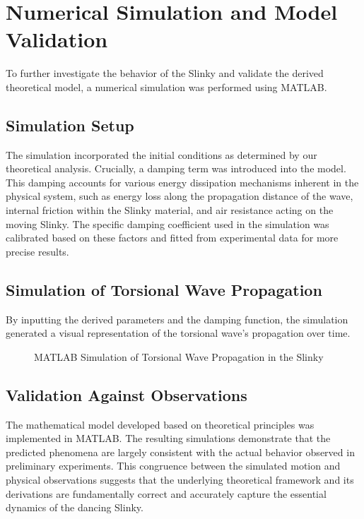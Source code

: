 \documentclass{mcmthesis}  %
\begin{document}
\section{Numerical Simulation and Model Validation}
To further investigate the behavior of the Slinky and validate the derived theoretical model, a numerical simulation was performed using MATLAB.

\subsection{Simulation Setup}
The simulation incorporated the initial conditions as determined by our theoretical analysis. Crucially, a damping term was introduced into the model. This damping accounts for various energy dissipation mechanisms inherent in the physical system, such as energy loss along the propagation distance of the wave, internal friction within the Slinky material, and air resistance acting on the moving Slinky. The specific damping coefficient used in the simulation was calibrated based on these factors and fitted from experimental data for more precise results.

\subsection{Simulation of Torsional Wave Propagation}
By inputting the derived parameters and the damping function, the simulation generated a visual representation of the torsional wave's propagation over time.

\begin{figure}[h!]
    \centering
    \caption{MATLAB Simulation of Torsional Wave Propagation in the Slinky}
    \label{fig:matlab_simulation}
\end{figure}

\subsection{Validation Against Observations}
The mathematical model developed based on theoretical principles was implemented in MATLAB. The resulting simulations demonstrate that the predicted phenomena are largely consistent with the actual behavior observed in preliminary experiments. This congruence between the simulated motion and physical observations suggests that the underlying theoretical framework and its derivations are fundamentally correct and accurately capture the essential dynamics of the dancing Slinky.
\end{document}
